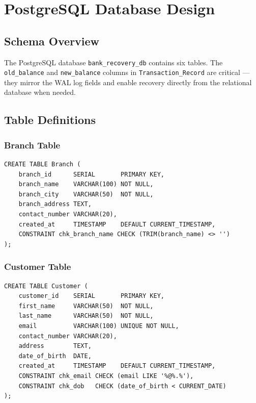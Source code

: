 
\chapter{PostgreSQL Database Design}

\section{Schema Overview}

The PostgreSQL database \texttt{bank\_recovery\_db} contains six tables.
The \texttt{old\_balance} and \texttt{new\_balance} columns in
\texttt{Transaction\_Record} are critical --- they mirror the WAL log fields
and enable recovery directly from the relational database when needed.

\section{Table Definitions}

\subsection{Branch Table}

\begin{lstlisting}[style=sqlstyle, caption={Branch Table}]
CREATE TABLE Branch (
    branch_id      SERIAL       PRIMARY KEY,
    branch_name    VARCHAR(100) NOT NULL,
    branch_city    VARCHAR(50)  NOT NULL,
    branch_address TEXT,
    contact_number VARCHAR(20),
    created_at     TIMESTAMP    DEFAULT CURRENT_TIMESTAMP,
    CONSTRAINT chk_branch_name CHECK (TRIM(branch_name) <> '')
);
\end{lstlisting}

\subsection{Customer Table}

\begin{lstlisting}[style=sqlstyle, caption={Customer Table}]
CREATE TABLE Customer (
    customer_id    SERIAL       PRIMARY KEY,
    first_name     VARCHAR(50)  NOT NULL,
    last_name      VARCHAR(50)  NOT NULL,
    email          VARCHAR(100) UNIQUE NOT NULL,
    contact_number VARCHAR(20),
    address        TEXT,
    date_of_birth  DATE,
    created_at     TIMESTAMP    DEFAULT CURRENT_TIMESTAMP,
    CONSTRAINT chk_email CHECK (email LIKE '%@%.%'),
    CONSTRAINT chk_dob   CHECK (date_of_birth < CURRENT_DATE)
);
\end{lstlisting}


